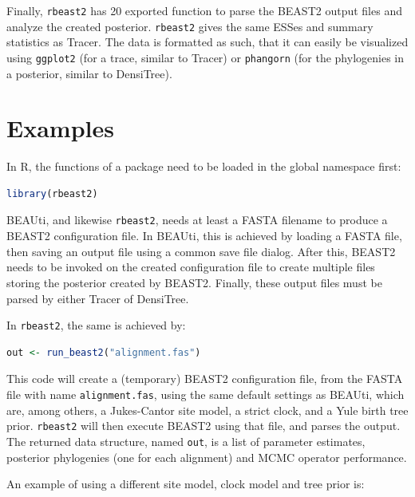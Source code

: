 \documentclass{article}
\begin{document}
Finally, \verb;rbeast2; has 20 exported function to parse the BEAST2 output
files and analyze the created posterior. \verb;rbeast2; gives the
same ESSes and summary statistics as Tracer. The data is formatted
as such, that it can easily be visualized using \verb;ggplot2; (for a trace,
similar to Tracer)
or \verb;phangorn; \cite{phangorn} (for the phylogenies in a posterior, similar to DensiTree). 

\section{Examples}

In R, the functions of a package need to be loaded in the global namespace first:

\begin{lstlisting}[language=R, floatplacement=H]
library(rbeast2)
\end{lstlisting}

BEAUti, and likewise \verb;rbeast2;, needs at least a FASTA filename
to produce a BEAST2 configuration file. 
In BEAUti, this is achieved by loading a FASTA file, 
then saving an output file using a common
save file dialog. After this, BEAST2 needs to be invoked
on the created configuration file to create multiple files
storing the posterior created by BEAST2. Finally, these output
files must be parsed by either Tracer of DensiTree.

In \verb;rbeast2;, the same is achieved by:

\begin{lstlisting}[language=R, floatplacement=H]
out <- run_beast2("alignment.fas")
\end{lstlisting}

This code will create a (temporary) BEAST2 configuration file,
from the FASTA file with name \verb;alignment.fas;, 
using the same default settings as BEAUti, which are, 
among others, a Jukes-Cantor site model, a strict clock, and a Yule birth tree prior.
\verb;rbeast2; will then execute BEAST2 using that file, and
parses the output. The returned data structure, named \verb;out;, 
is a list of parameter estimates, posterior phylogenies (one for each alignment)
and MCMC operator performance. 

An example of using a different site model, clock model 
and tree prior is:
\end{document}
